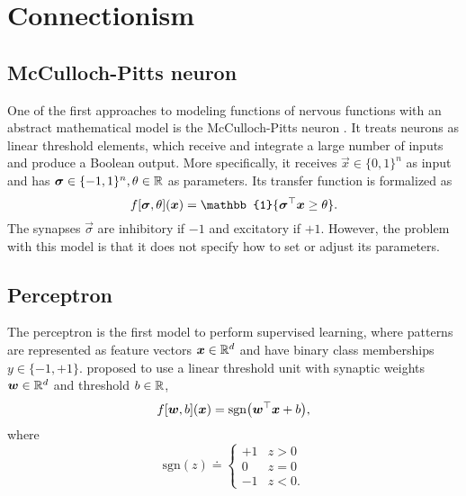 \section{Connectionism}

\subsection{McCulloch-Pitts neuron}

One of the first approaches to modeling functions of nervous functions with an abstract
mathematical model is the McCulloch-Pitts neuron \citep{mcculloch1943logical}. It treats neurons as
linear threshold elements, which receive and integrate a large number of inputs and produce a
Boolean output. More specifically, it receives $\vec{x} \in \{ 0,1 \}^n$ as input and has
$\bm{\sigma} \in \{ -1, 1 \}^n, \theta \in \mathbb{R}$ as parameters. Its transfer function is formalized
as \[
    f[\vec{\sigma}, \theta](\vec{x}) = \mathbb{1}\{ \transpose{\vec{\sigma}} \vec{x} \geq \theta \}.
\]
The synapses $\vec{\sigma}$ are inhibitory if $-1$ and excitatory if $+1$. However, the problem
with this model is that it does not specify how to set or adjust its parameters.

\subsection{Perceptron}

The perceptron \citep{rosenblatt1958perceptron} is the first model to perform supervised learning,
where patterns are represented as feature vectors $\bm{x} \in \mathbb{R}^d$ and have binary class
memberships $y \in \{ -1, +1 \}$. \citet*{rosenblatt1958perceptron} proposed to use a linear
threshold unit with synaptic weights $\bm{w} \in \mathbb{R}^d$ and threshold $b \in \mathbb{R}$, \[
    f[\vec{w}, b](\vec{x}) = \mathrm{sgn}\lft( \transpose{\vec{w}}\vec{x} + b \rgt),
\]
where \[
    \mathrm{sgn}(z) \doteq
    \begin{cases}
        +1 & z > 0  \\
        0  & z = 0  \\
        -1 & z < 0.
    \end{cases}
\]


